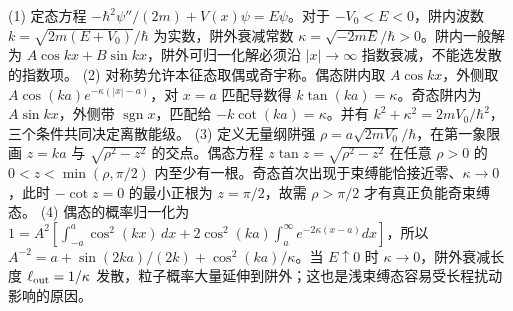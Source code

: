 (1) 定态方程 \(-\hbar^2\psi''/(2m)+V(x)\psi=E\psi\)。对于 \(-V_0<E<0\)，阱内波数 \(k=\sqrt{2m(E+V_0)}/\hbar\) 为实数，阱外衰减常数 \(\kappa=\sqrt{-2mE}/\hbar>0\)。阱内一般解为 \(A\cos kx+B\sin kx\)，阱外可归一化解必须沿 \(|x|\to\infty\) 指数衰减，不能选发散的指数项。
(2) 对称势允许本征态取偶或奇宇称。偶态阱内取 \(A\cos kx\)，外侧取 \(A\cos(ka)e^{-\kappa(|x|-a)}\)，对 \(x=a\) 匹配导数得 \(k\tan(ka)=\kappa\)。奇态阱内为 \(A\sin kx\)，外侧带 \(\operatorname{sgn}x\)，匹配给 \(-k\cot(ka)=\kappa\)。并有 \(k^2+\kappa^2=2mV_0/\hbar^2\)，三个条件共同决定离散能级。
(3) 定义无量纲阱强 \(\rho=a\sqrt{2mV_0}/\hbar\)，在第一象限画 \(z=ka\) 与 \(\sqrt{\rho^2-z^2}\) 的交点。偶态方程 \(z\tan z=\sqrt{\rho^2-z^2}\) 在任意 \(\rho>0\) 的 \(0<z<\min(\rho,\pi/2)\) 内至少有一根。奇态首次出现于束缚能恰接近零、\(\kappa\to0\)，此时 \(-\cot z=0\) 的最小正根为 \(z=\pi/2\)，故需 \(\rho>\pi/2\) 才有真正负能奇束缚态。
(4) 偶态的概率归一化为 \(1=A^2[\int_{-a}^{a}\cos^2(kx)\,dx+2\cos^2(ka)\int_a^\infty e^{-2\kappa(x-a)}dx]\)，所以 \(A^{-2}=a+\sin(2ka)/(2k)+\cos^2(ka)/\kappa\)。当 \(E\uparrow0\) 时 \(\kappa\to0\)，阱外衰减长度 \(\ell_{\rm out}=1/\kappa\) 发散，粒子概率大量延伸到阱外；这也是浅束缚态容易受长程扰动影响的原因。

